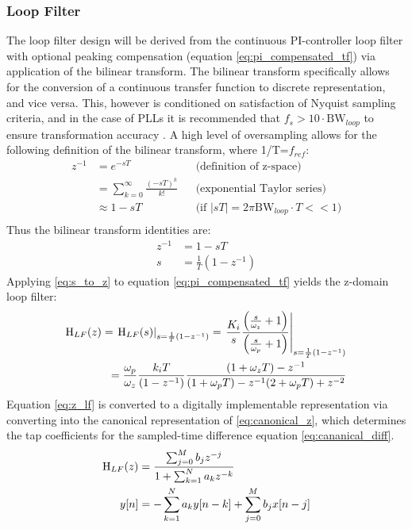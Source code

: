 \subsubsection{Loop Filter}
The loop filter design will be derived from the continuous PI-controller loop filter with optional peaking compensation (equation \ref{eq:pi_compensated_tf}) via application of the bilinear transform. The bilinear transform specifically allows for the conversion of a continuous transfer function to discrete representation, and vice versa. This, however is conditioned on satisfaction of Nyquist sampling criteria, and in the case of PLLs it is recommended that $f_s > 10\cdot\mathrm{BW}_{loop}$ to ensure transformation accuracy \cite{gardner_1980}. A high level of oversampling allows for the following definition of the bilinear transform, where 1/T=$f_{ref}$:
\begin{align*}
	z^{-1} &= e^{-sT} && \text{(definition of z-space)} \\
	&= \sum_{k=0}^\infty\frac{(-sT)^k}{k!} && \text{(exponential Taylor series)} \\
	&\approx 1-sT &&\text{(if $|sT| = 2\pi\mathrm{BW}_{loop}\cdot T << 1$)} \\
\end{align*}
Thus the bilinear transform identities are:
\begin{align}
	z^{-1} &= 1-sT\\
	s &= \frac{1}{T}(1-z^{-1}) \label{eq:s_to_z}
\end{align}
Applying \ref{eq:s_to_z} to equation \ref{eq:pi_compensated_tf} yields the z-domain loop filter:
\begin{align}
	\textnormal{H}_{LF}(z) = \left.\textnormal{H}_{LF}(s)\right\vert_{s=\frac{1}{T}(1-z^{-1})} = \left.\frac{K_i}{s}\frac{\left(\frac{s}{\omega_z} + 1\right)}{\left(\frac{s}{\omega_p} + 1\right)}\right\vert_{s=\frac{1}{T}(1-z^{-1})}\\
	= \frac{\omega_p}{\omega_z}\frac{k_iT}{(1-z^{-1})}\frac{(1+\omega_zT)-z^{-1}}{(1+\omega_pT) - z^{-1}(2+\omega_pT) + z^{-2}}\label{eq:z_lf}
\end{align}
Equation \ref{eq:z_lf} is converted to a digitally implementable representation via converting into the canonical representation of \ref{eq:canonical_z}, which determines the tap coefficients for the sampled-time difference equation \ref{eq:cananical_diff}. 
\begin{align}
	\textnormal{H}_{LF}(z) &= \frac{\sum_{j=0}^M b_jz^{-j}}{1+\sum_{k=1}^N a_kz^{-k}}\label{eq:canonical_z} \\
	y[n]&= -\sum_{k=1}^N a_ky[n-k] + \sum_{j=0}^M b_jx[n-j] \label{eq:cananical_diff}
\end{align}
